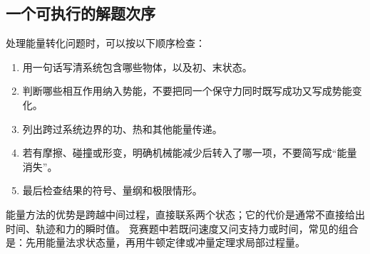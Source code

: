 {\subsection{一个可执行的解题次序}\nopagebreak[4]

处理能量转化问题时，可以按以下顺序检查：
\begin{enumerate}[label=\arabic*.,leftmargin=2.2em]
  \item 用一句话写清系统包含哪些物体，以及初、末状态。
  \item 判断哪些相互作用纳入势能，不要把同一个保守力同时既写成功又写成势能变化。
  \item 列出跨过系统边界的功、热和其他能量传递。
  \item 若有摩擦、碰撞或形变，明确机械能减少后转入了哪一项，不要简写成“能量消失”。
  \item 最后检查结果的符号、量纲和极限情形。
\end{enumerate}
\nopagebreak[4]
能量方法的优势是跨越中间过程，直接联系两个状态；它的代价是通常不直接给出时间、轨迹和力的瞬时值。
竞赛题中若既问速度又问支持力或时间，常见的组合是：先用能量法求状态量，再用牛顿定律或冲量定理求局部过程量。
}

\endgroup

